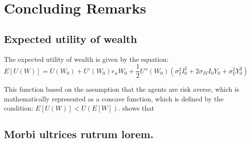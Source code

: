 \chapter{Concluding Remarks}






\begin{apendicesenv}

\partapendices

\chapter{Expected utility of wealth}

The expected utility of wealth is given by the equation:
\begin{equation}
  E[U(W)] = U(W_0) + U'(W_0)r_w W_0 + \frac{1}{2}U''(W_0)(\sigma_I^2 I_0^2 + 2\sigma_{IY} I_0 Y_0 + \sigma_Y^2 Y_0^2)
\end{equation}

This function based on the assumption that the agents are risk averse, which is mathematically represented as a concave function, which is defined by the condition: $E[U(W)] < U(E[W])$.  shows that 

\end{apendicesenv}


\begin{anexosenv}

\partanexos

\chapter{Morbi ultrices rutrum lorem.}
\lipsum[30]

\end{anexosenv}

\printindex



